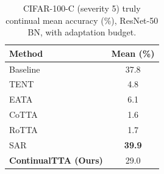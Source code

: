 \begin{table}[t]
\centering
\caption{CIFAR-100-C (severity 5) truly continual mean accuracy (\%), ResNet-50 BN, with adaptation budget.}
\label{tab:cifar100_continual_budget}
\begin{tabular}{lc}
\toprule
Method & Mean (\%) \\
\midrule
Baseline & 37.8 \\
TENT & 4.8 \\
EATA & 6.1 \\
CoTTA & 1.6 \\
RoTTA & 1.7 \\
SAR & \textbf{39.9} \\
\textbf{ContinualTTA (Ours)} & 29.0 \\
\bottomrule
\end{tabular}
\end{table}
